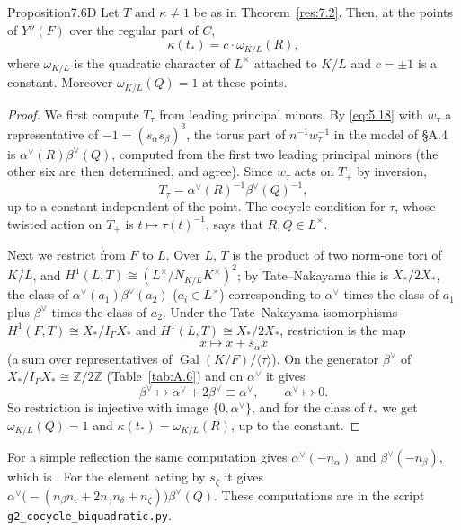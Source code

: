 \documentclass[12pt,letterpaper]{amsart}
\theoremstyle{plain}
\theoremstyle{definition}
\theoremstyle{remark}
\theoremstyle{definition}
\newcommand{\zzz}{\mathbb{Z}}
\DeclareMathOperator{\Gal}{Gal}
\begin{document}
\begin{res}{Proposition}{7.6D}\label{res:7.6D}
Let $T$ and $\kappa\neq1$ be as in Theorem~\ref{res:7.2}. Then, at the points
of $Y''(F)$ over the regular part of $C$,
\[
\kappa(t_*)=c\cdot\omega_{K/L}(R),
\]
where $\omega_{K/L}$ is the quadratic character of $L^\times$ attached to
$K/L$ and $c=\pm1$ is a constant. Moreover $\omega_{K/L}(Q)=1$ at these points.
\end{res}

\begin{proof}
We first compute $T_\tau$ from leading principal minors.
By \eqref{eq:5.18} with $w_\tau$ a representative of $-1=(s_\alpha s_\beta)^3$,
the torus part of $n^{-1}w_\tau^{-1}$ in the model of \S A.4 is
$\alpha^\vee(R)\beta^\vee(Q)$, computed from the first two leading principal
minors (the other six are then determined, and agree). Since $w_\tau$ acts on
$T_+$ by inversion,
\[
T_\tau=\alpha^\vee(R)^{-1}\beta^\vee(Q)^{-1},
\]
up to a
constant independent of the point. The cocycle condition for $\tau$, whose
twisted action on $T_+$ is $t\mapsto\tau(t)^{-1}$, says that $R,Q\in L^\times$.

Next we restrict from $F$ to $L$. Over $L$, $T$ is the product of two norm-one tori of $K/L$, and
$H^1(L,T)\cong(L^\times/N_{K/L}K^\times)^2$; by Tate--Nakayama this is
$X_*/2X_*$, the class of $\alpha^\vee(a_1)\beta^\vee(a_2)$ ($a_i\in L^\times$)
corresponding to $\alpha^\vee$ times the class of $a_1$ plus $\beta^\vee$
times the class of $a_2$. Under the Tate--Nakayama isomorphisms
$H^1(F,T)\cong X_*/I_\Gamma X_*$ and $H^1(L,T)\cong X_*/2X_*$, restriction is the
map
\[
x\longmapsto x+s_\alpha x
\]
(a sum over representatives of
$\Gal(K/F)/\langle\tau\rangle$). On the generator $\beta^\vee$ of
$X_*/I_\Gamma X_*\cong\zzz/2\zzz$ (Table~\ref{tab:A.6}) and on $\alpha^\vee$
it gives
\[
\beta^\vee\longmapsto\alpha^\vee+2\beta^\vee\equiv\alpha^\vee,\qquad
\alpha^\vee\longmapsto 0.
\]
So
restriction is injective with image $\{0,\alpha^\vee\}$, and for the class of
$t_*$ we get $\omega_{K/L}(Q)=1$ and $\kappa(t_*)=\omega_{K/L}(R)$, up to the
constant.
\end{proof}

For a simple reflection the same computation gives $\alpha^\vee(-n_\alpha)$ and
$\beta^\vee(-n_\beta)$, which is \cite[Ch.~I, Cor.~5.4]{Ha92a}. For the element
acting by $s_\zeta$ it gives
$\alpha^\vee\bigl(-(n_\beta n_\epsilon+2n_\gamma n_\delta+n_\zeta)\bigr)\beta^\vee(Q)$.
These computations are in the script \texttt{g2\_cocycle\_biquadratic.py}.
\end{document}
